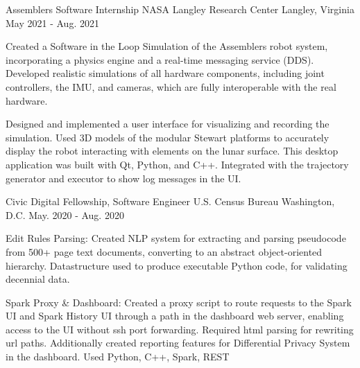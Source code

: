 

\begin{cventries}

  \cventry
  {Assemblers Software Internship} %
  {NASA Langley Research Center} %
  {Langley, Virginia} %
  {May 2021 - Aug. 2021} %
  {
    \begin{cvitems} %
      \item {Created a Software in the Loop Simulation of the Assemblers robot system, incorporating a physics engine and a real-time messaging service (DDS). Developed realistic simulations of all hardware components, including joint controllers, the IMU, and cameras, which are fully interoperable with the real hardware.}
      \item {Designed and implemented a user interface for visualizing and recording the simulation. Used 3D models of the modular Stewart platforms to accurately display the robot interacting with elements on the lunar surface. This desktop application was built with Qt, Python, and C++. Integrated with the trajectory generator and executor to show log messages in the UI.}
    \end{cvitems}
  }

  \cventry
  {Civic Digital Fellowship, Software Engineer} %
  {U.S. Census Bureau} %
  {Washington, D.C.} %
  {May. 2020 - Aug. 2020} %
  {
    \begin{cvitems} %
      \item {Edit Rules Parsing: Created NLP system for extracting and parsing pseudocode from 500+ page text documents, converting to an abstract object-oriented hierarchy. Datastructure used to produce executable Python code, for validating decennial data.}
      \item {Spark Proxy \& Dashboard: Created a proxy script to route requests to the Spark UI and Spark History UI through a path in the dashboard web server, enabling access to the UI without ssh port forwarding. Required html parsing for rewriting url paths. Additionally created reporting features for Differential Privacy System in the dashboard. Used Python, C++, Spark, REST}
    \end{cvitems}
  }


\end{cventries}
